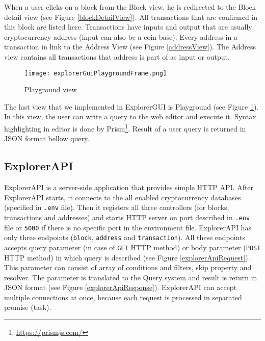 When a user clicks on a block from the Block view, he is redirected to the Block detail view (see Figure \ref{blockDetailView}). All transactions that are confirmed in this block are listed here. Transactions have inputs and output that are usually cryptocurrency address (input can also be a coin base). Every address in a transaction in link to the Address View (see Figure \ref{addressView}). The Address view contains all transactions that address is part of as input or output.

\begin{figure}[h]
    \centering
    \texttt{[image: explorerGuiPlaygroundFrame.png]}
    \caption{Playground view}
    \label{playgroundView}
\end{figure}

The last view that we implemented in ExplorerGUI is Playground (see Figure \ref{playgroundView}). In this view, the user can write a query to the web editor and execute it. Syntax highlighting in editor is done by Prism\footnote{\url{https://prismjs.com/}}. Result of a user query is returned in JSON format bellow query.


\subsection{ExplorerAPI}
ExplorerAPI is a server-side application that provides simple HTTP API.
After ExplorerAPI starts, it connects to the all enabled cryptocurrency databases (specified in \texttt{.env} file). Then it registers all three controllers (for blocks, transactions and addresses) and starts HTTP server on port described in \texttt{.env} file or \texttt{5000} if there is no specific port in the environment file. ExplorerAPI has only three endpoints (\texttt{block}, \texttt{address} and \texttt{transaction}). All these endpoints accepts query parameter (in case of \texttt{GET} HTTP method) or body parameter (\texttt{POST} HTTP method) in which query is described (see Figure \ref{explorerApiRequest}). This parameter can consist of array of conditions and filters, skip property and resolver. The parameter is translated to the Query system and result is return in JSON format (see Figure \ref{explorerApiResponse}). ExplorerAPI can accept multiple connections at once, because each request is processed in separated promise (task).


